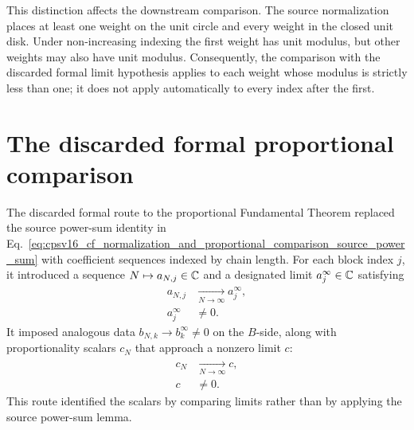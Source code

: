 \documentclass{article}
\begin{document}
This distinction affects the downstream comparison. The source normalization
places at least one weight on the unit circle and every weight in the closed
unit disk. Under non-increasing indexing the first weight has unit modulus, but
other weights may also have unit modulus. Consequently, the comparison with the
discarded formal limit hypothesis applies to each weight whose modulus is
strictly less than one; it does not apply automatically to every index after
the first.

\section{The discarded formal proportional comparison}

The discarded formal route to the proportional Fundamental Theorem replaced
the source power-sum identity in
Eq.~\ref{eq:cpsv16_cf_normalization_and_proportional_comparison_source_power_sum}
with coefficient sequences indexed by chain length. For each block index $j$,
it introduced a sequence $N\mapsto a_{N,j}\in\mathbb{C}$ and a designated limit
$a_j^\infty\in\mathbb{C}$ satisfying
\begin{align}
    a_{N,j}
        &\xrightarrow[N\to\infty]{} a_j^\infty,
    \label{eq:cpsv16_cf_normalization_and_proportional_comparison_formal_coefficient_limit}\\
    a_j^\infty
        &\neq 0.
    \label{eq:cpsv16_cf_normalization_and_proportional_comparison_formal_nonzero_limit}
\end{align}
It imposed analogous data $b_{N,k}\to b_k^\infty\neq 0$ on the $B$-side, along
with proportionality scalars $c_N$ that approach a nonzero limit $c$:
\begin{align}
    c_N
        &\xrightarrow[N\to\infty]{} c,
    \label{eq:cpsv16_cf_normalization_and_proportional_comparison_scalar_limit}\\
    c
        &\neq 0.
    \label{eq:cpsv16_cf_normalization_and_proportional_comparison_nonzero_scalar_limit}
\end{align}
This route identified the scalars by comparing limits rather than by applying
the source power-sum lemma.
\end{document}
